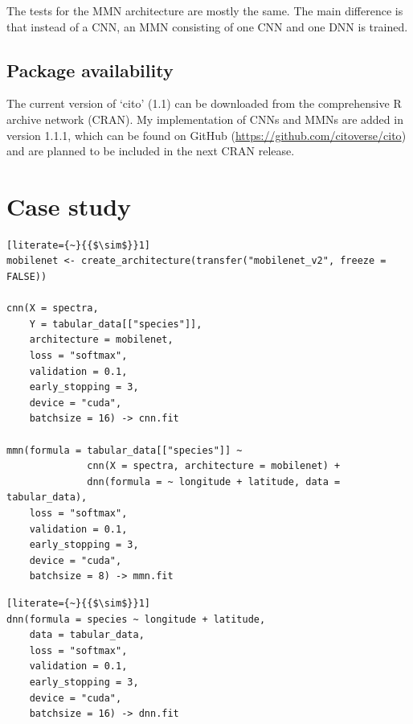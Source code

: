 \documentclass[12pt,twoside]{scrreport}
\newcommand{\pkg}[1]{`#1'}
\begin{document}
The tests for the MMN architecture are mostly the same. The main difference is that instead of a CNN, an MMN consisting of one CNN and one DNN is trained.

\section*{Package availability}
The current version of \pkg{cito} (1.1) can be downloaded from the comprehensive R archive network (CRAN). My implementation of CNNs and MMNs are added in version 1.1.1, which can be found on GitHub (\url{https://github.com/citoverse/cito}) and are planned to be included in the next CRAN release.

\chapter*{Case study}
\newsavebox{\cnn} %
\begin{lrbox}{\cnn}
	\begin{lstlisting}[literate={~}{{$\sim$}}1]
mobilenet <- create_architecture(transfer("mobilenet_v2", freeze = FALSE))

cnn(X = spectra,
    Y = tabular_data[["species"]],
    architecture = mobilenet,
    loss = "softmax",
    validation = 0.1,
    early_stopping = 3,
    device = "cuda",
    batchsize = 16) -> cnn.fit
		
mmn(formula = tabular_data[["species"]] ~ 
              cnn(X = spectra, architecture = mobilenet) +
              dnn(formula = ~ longitude + latitude, data = tabular_data),
    loss = "softmax",
    validation = 0.1,
    early_stopping = 3,
    device = "cuda",
    batchsize = 8) -> mmn.fit
	\end{lstlisting}
\end{lrbox}

\newsavebox{\dnn} %
\begin{lrbox}{\dnn}
	\begin{minipage}{\wd\cnn}
		\begin{lstlisting}[literate={~}{{$\sim$}}1]
dnn(formula = species ~ longitude + latitude,                             
    data = tabular_data,
    loss = "softmax",
    validation = 0.1,
    early_stopping = 3,
    device = "cuda",
    batchsize = 16) -> dnn.fit
		\end{lstlisting}
	\end{minipage}
\end{lrbox}
\end{document}
